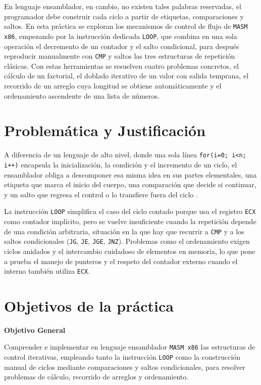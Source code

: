 \documentclass[a4paper,12pt]{article}
\begin{document}
En lenguaje ensamblador, en cambio, no existen tales palabras reservadas, el programador debe construir cada ciclo a partir de etiquetas, comparaciones y saltos. En esta práctica se exploran los mecanismos de control de flujo de \texttt{MASM x86}, empezando por la instrucción dedicada \texttt{LOOP}, que combina en una sola operación el decremento de un contador y el salto condicional, para después reproducir manualmente con \texttt{CMP} y saltos las tres estructuras de repetición clásicas. Con estas herramientas se resuelven cuatro problemas concretos, el cálculo de un factorial, el doblado iterativo de un valor con salida temprana, el recorrido de un arreglo cuya longitud se obtiene automáticamente y el ordenamiento ascendente de una lista de números.

\section{Problemática y Justificación}
A diferencia de un lenguaje de alto nivel, donde una sola línea \texttt{for(i=0; i<n; i++)} encapsula la inicialización, la condición y el incremento de un ciclo, el ensamblador obliga a descomponer esa misma idea en sus partes elementales, una etiqueta que marca el inicio del cuerpo, una comparación que decide si continuar, y un salto que regresa el control o lo transfiere fuera del ciclo \cite{irvine2020assembly}.

La instrucción \texttt{LOOP} simplifica el caso del ciclo contado porque usa el registro \texttt{ECX} como contador implícito, pero se vuelve insuficiente cuando la repetición depende de una condición arbitraria, situación en la que hay que recurrir a \texttt{CMP} y a los saltos condicionales (\texttt{JG}, \texttt{JE}, \texttt{JGE}, \texttt{JNZ}). Problemas como el ordenamiento exigen ciclos anidados y el intercambio cuidadoso de elementos en memoria, lo que pone a prueba el manejo de punteros y el respeto del contador externo cuando el interno también utiliza \texttt{ECX}.

\section{Objetivos de la práctica}
\textbf{Objetivo General}

Comprender e implementar en lenguaje ensamblador \texttt{MASM x86} las estructuras de control iterativas, empleando tanto la instrucción \texttt{LOOP} como la construcción manual de ciclos mediante comparaciones y saltos condicionales, para resolver problemas de cálculo, recorrido de arreglos y ordenamiento.
\end{document}
